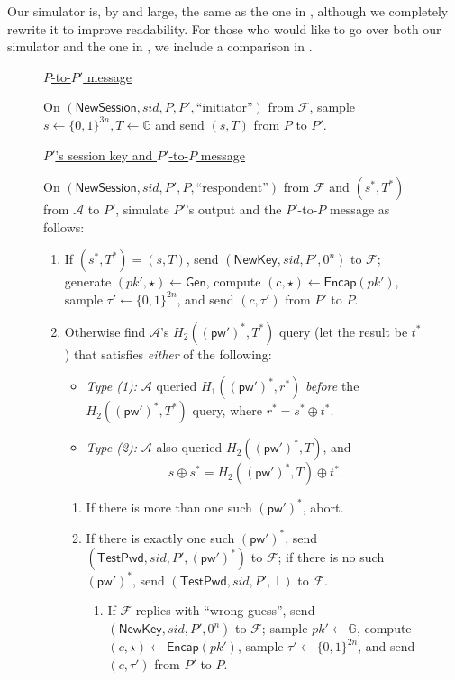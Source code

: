 \documentclass{article}
\theoremstyle{plain}
\theoremstyle{definition}
\theoremstyle{remark}
\newcommand{\group}{\mathbb{G}}
\newcommand{\adv}{\mathcal{A}}
\newcommand{\func}{\mathcal{F}}
\newcommand{\Gen}{\mathsf{Gen}}
\newcommand{\Encap}{\mathsf{Encap}}
\newcommand{\pw}{\mathsf{pw}}
\newcommand{\NewSession}{\mathsf{NewSession}}
\newcommand{\TestPwd}{\mathsf{TestPwd}}
\newcommand{\NewKey}{\mathsf{NewKey}}
\begin{document}
Our simulator is, by and large, the same as the one in \cite[Fig.5~and~6]{EPRINT:ArrBarJar25}, although we completely rewrite it to improve readability. For those who would like to go over both our simulator and the one in \cite{EPRINT:ArrBarJar25}, we include a comparison in .
\begin{figure}[H]
\begin{framed}
\begin{small}
\underline{$P$-to-$P'$ message}

\medskip
On $(\NewSession, sid, P, P', \text{``initiator''})$ from $\func$, sample $s \gets \{0,1\}^{3n}, T \gets \group$ and send $(s,T)$ from $P$ to $P'$.

\medskip
\underline{$P'$'s session key and $P'$-to-$P$ message}

\medskip
On $(\NewSession, sid, P', P, \text{``respondent''})$ from $\func$ and $(s^*,T^*)$ from $\adv$ to $P'$, simulate $P'$'s output and the $P'$-to-$P$ message as follows:
\begin{enumerate}
  \item If $(s^*,T^*) = (s,T)$, send $(\NewKey, sid, P', 0^n)$ to $\func$; generate $(pk',\star) \gets \Gen$, compute $(c,\star) \gets \Encap(pk')$, sample $\tau' \gets \{0,1\}^{2n}$, and send $(c,\tau')$ from $P'$ to $P$.
  \item Otherwise find $\adv$'s $H_2((\pw')^*,T^*)$ query (let the result be $t^*$) that satisfies \emph{either} of the following:
      \begin{itemize}
        \item \emph{Type (1):} $\adv$ queried $H_1((\pw')^*,r^*)$ \emph{before} the $H_2((\pw')^*,T^*)$ query, where $r^* = s^* \oplus t^*$.
        \item \emph{Type (2):} $\adv$ also queried $H_2((\pw')^*,T)$, and
            \[
            s \oplus s^* = H_2((\pw')^*,T) \oplus t^*.
            \]
      \end{itemize}
      \begin{enumerate}
        \item If there is more than one such $(\pw')^*$, abort.
        \item If there is exactly one such $(\pw')^*$, send $(\TestPwd, sid, P', (\pw')^*)$ to $\func$; if there is no such $(\pw')^*$, send $(\TestPwd, sid, P', \bot)$ to $\func$.
            \begin{enumerate}
              \item If $\func$ replies with ``wrong guess'', send $(\NewKey, sid, P', 0^n)$ to $\func$; {\color{red}sample $pk' \gets \group$}, compute $(c,\star) \gets \Encap(pk')$, sample $\tau' \gets \{0,1\}^{2n}$, and send $(c,\tau')$ from $P'$ to $P$.

\end{enumerate}
\end{enumerate}
\end{enumerate}
\end{small}
\end{framed}
\end{figure}
\end{document}
